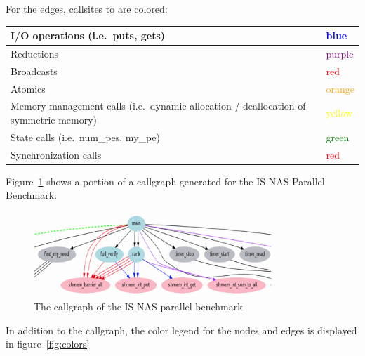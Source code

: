 \vspace{0.1in}

For the edges, callsites to \openshmem are colored:

\vspace{0.1in}

\begin{center}
  \begin{tabular}{| p{10cm} | l |}
    \hline
    I/O operations (i.e.\ puts, gets) & \textcolor{Blue}{blue} \\
    \hline
    Reductions & \textcolor{Purple}{purple} \\
    \hline
    Broadcasts & \textcolor{Red}{red} \\
    \hline
    Atomics & \textcolor{Orange}{orange} \\
    \hline
    Memory management calls (i.e.\ dynamic allocation / deallocation of symmetric memory) & \textcolor{Yellow}{yellow} \\
    \hline
    State calls (i.e.\ num\_pes, my\_pe) & \textcolor{Green}{green} \\
    \hline
    Synchronization calls & \textcolor{Red}{red} \\
    \hline
  \end{tabular}
\end{center}

\vspace{0.1in}

Figure~\ref{fig:is-callgraph} shows a portion of a callgraph generated
for the IS NAS Parallel Benchmark:

\begin{figure}[!h]
  \begin{center}
    \includegraphics[width=0.8\textwidth]{./image004}
    \caption{The \openshmem callgraph of the IS NAS parallel benchmark}
    \label{fig:is-callgraph}
  \end{center}
\end{figure}

In addition to the callgraph, the color legend for the nodes and edges
is displayed in figure~\ref{fig:colors}

\vspace{0.1in}

